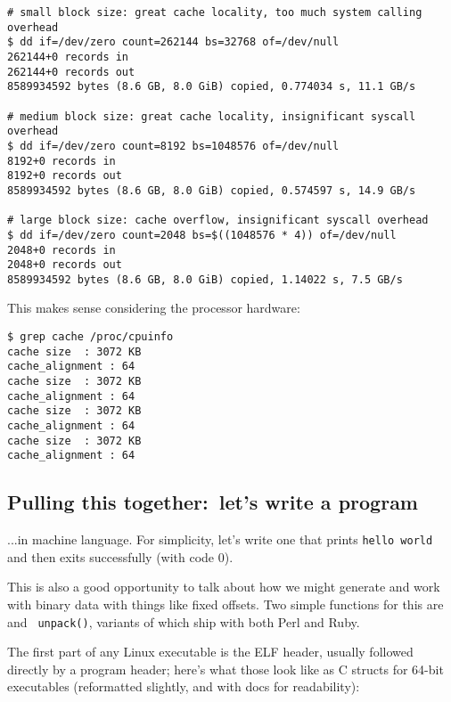 \begin{verbatim}
# small block size: great cache locality, too much system calling overhead
$ dd if=/dev/zero count=262144 bs=32768 of=/dev/null
262144+0 records in
262144+0 records out
8589934592 bytes (8.6 GB, 8.0 GiB) copied, 0.774034 s, 11.1 GB/s

# medium block size: great cache locality, insignificant syscall overhead
$ dd if=/dev/zero count=8192 bs=1048576 of=/dev/null
8192+0 records in
8192+0 records out
8589934592 bytes (8.6 GB, 8.0 GiB) copied, 0.574597 s, 14.9 GB/s

# large block size: cache overflow, insignificant syscall overhead
$ dd if=/dev/zero count=2048 bs=$((1048576 * 4)) of=/dev/null
2048+0 records in
2048+0 records out
8589934592 bytes (8.6 GB, 8.0 GiB) copied, 1.14022 s, 7.5 GB/s\end{verbatim}

This makes sense considering the processor hardware:

\begin{verbatim}
$ grep cache /proc/cpuinfo
cache size	: 3072 KB
cache_alignment	: 64
cache size	: 3072 KB
cache_alignment	: 64
cache size	: 3072 KB
cache_alignment	: 64
cache size	: 3072 KB
cache_alignment	: 64\end{verbatim}

\subsection{Pulling this together:~let's write a program}
...in machine language. For simplicity, let's write one that prints {\tt hello
world} and then exits successfully (with code 0).

This is also a good opportunity to talk about how we might generate and work
with binary data with things like fixed offsets. Two simple functions for this
are  and {\tt
unpack()}, variants of which ship with both Perl and Ruby.

The first part of any Linux executable is the ELF header, usually followed
directly by a program header; here's what those look like as C structs for
64-bit executables (reformatted slightly, and with docs for readability):

